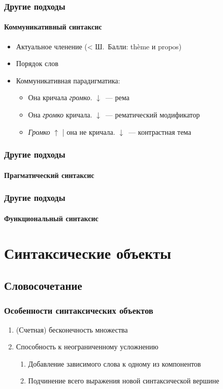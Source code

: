 \begin{frame}
  \frametitle{Другие подходы}
  \framesubtitle{Коммуникативный синтаксис}

  \begin{itemize}
    \item Актуальное членение (< Ш.~Балли: thème и propos)
    \item Порядок слов
    \item Коммуникативная парадигматика: \begin{itemize}
      \item Она кричала \textit{громко}. $\downarrow$~--- рема
      \item Она \textit{громко} кричала. $\downarrow$~--- рематический модификатор
      \item \textit{Громко} $\uparrow$ | она не кричала. $\downarrow$~--- контрастная тема
    \end{itemize}
  \end{itemize}
\end{frame}

\begin{frame}
  \frametitle{Другие подходы}
  \framesubtitle{Прагматический синтаксис}
\end{frame}

\begin{frame}
  \frametitle{Другие подходы}
  \framesubtitle{Функциональный синтаксис}
\end{frame}


\section{Синтаксические объекты}

\subsection{Словосочетание}

\begin{frame}
  \frametitle{Особенности синтаксических объектов}

  \begin{enumerate}
    \item (Счетная) бесконечность множества
    \item Способность к неограниченному усложнению \begin{enumerate}
      \item Добавление зависимого слова к одному из компонентов
      \item Подчинение всего выражения новой синтаксической вершине
    \end{enumerate}
  \end{enumerate}
\end{frame}

